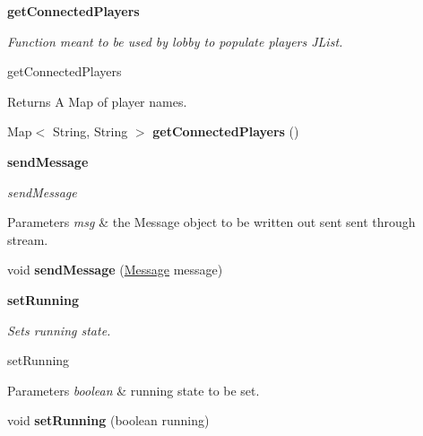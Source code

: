 \begin{Indent}{\bf get\+Connected\+Players}\par
{\em Function meant to be used by lobby to populate players J\+List.

get\+Connected\+Players

\begin{DoxyReturn}{Returns}
A Map of player names. 
\end{DoxyReturn}
}\begin{DoxyCompactItemize}
\item 
\hypertarget{classbattleship_1_1network_1_1ClientConnection_aaaa08f160bc7c75616848475ce0cc243}{}Map$<$ String, String $>$ {\bfseries get\+Connected\+Players} ()\label{classbattleship_1_1network_1_1ClientConnection_aaaa08f160bc7c75616848475ce0cc243}

\end{DoxyCompactItemize}
\end{Indent}
\begin{Indent}{\bf send\+Message}\par
{\em send\+Message


\begin{DoxyParams}{Parameters}
{\em msg} & the Message object to be written out sent sent through stream. \\
\hline
\end{DoxyParams}
}\begin{DoxyCompactItemize}
\item 
\hypertarget{classbattleship_1_1network_1_1ClientConnection_ab980895b542043946e1edb67c1d62e41}{}void {\bfseries send\+Message} (\hyperlink{classbattleship_1_1game_1_1Message}{Message} message)\label{classbattleship_1_1network_1_1ClientConnection_ab980895b542043946e1edb67c1d62e41}

\end{DoxyCompactItemize}
\end{Indent}
\begin{Indent}{\bf set\+Running}\par
{\em Sets running state.

set\+Running


\begin{DoxyParams}{Parameters}
{\em boolean} & running state to be set. \\
\hline
\end{DoxyParams}
}\begin{DoxyCompactItemize}
\item 
\hypertarget{classbattleship_1_1network_1_1ClientConnection_a120340f67be30e607e16bb03a81b2f84}{}void {\bfseries set\+Running} (boolean running)\label{classbattleship_1_1network_1_1ClientConnection_a120340f67be30e607e16bb03a81b2f84}

\end{DoxyCompactItemize}
\end{Indent}


